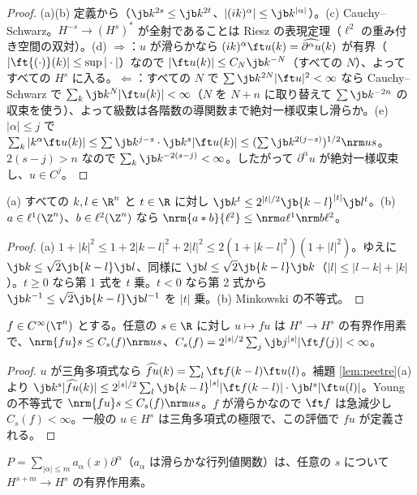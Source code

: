 \begin{proof}
(a)(b) 定義から（$\jb k^{2s}\le\jb k^{2t}$、$|(ik)^\alpha|\le\jb k^{|\alpha|}$）。(c) Cauchy--Schwarz。$H^{-s}\to(H^s)^*$ が全射であることは Riesz の表現定理（$\ell^2$ の重み付き空間の双対）。(d) $\Rightarrow$：$u$ が滑らかなら $(ik)^\alpha\ft u(k)=\widehat{\partial^\alpha u}(k)$ が有界（$|\ft{(\cdot)}(k)|\le\sup|\cdot|$）なので $|\ft u(k)|\le C_N\jb k^{-N}$（すべての $N$）、よってすべての $H^s$ に入る。$\Leftarrow$：すべての $N$ で $\sum\jb k^{2N}|\ft u|^2<\infty$ なら Cauchy--Schwarz で $\sum_k\jb k^{N}|\ft u(k)|<\infty$（$N$ を $N+n$ に取り替えて $\sum\jb k^{-2n}$ の収束を使う）、よって級数は各階数の導関数まで絶対一様収束し滑らか。(e) $|\alpha|\le j$ で $\sum_k|k^\alpha\ft u(k)|\le\sum\jb k^{j-s}\cdot\jb k^s|\ft u(k)|\le(\sum\jb k^{2(j-s)})^{1/2}\nrm us$。$2(s-j)>n$ なので $\sum_k\jb k^{-2(s-j)}<\infty$。したがって $\partial^\alpha u$ が絶対一様収束し、$u\in C^j$。
\end{proof}

\begin{lem}\label{lem:peetre}\tP
(a) すべての $k,l\in\R^n$ と $t\in\R$ に対し $\jb k^t\le2^{|t|/2}\jb{k-l}^{|t|}\jb l^t$。(b) $a\in\ell^1(\Z^n)$、$b\in\ell^2(\Z^n)$ なら $\nrm{a*b}{\ell^2}\le\nrm a{\ell^1}\nrm b{\ell^2}$。
\end{lem}
\begin{proof}
(a) $1+|k|^2\le1+2|k-l|^2+2|l|^2\le2(1+|k-l|^2)(1+|l|^2)$。ゆえに $\jb k\le\sqrt2\jb{k-l}\jb l$、同様に $\jb l\le\sqrt2\jb{k-l}\jb k$（$|l|\le|l-k|+|k|$）。$t\ge0$ なら第 1 式を $t$ 乗。$t<0$ なら第 2 式から $\jb k^{-1}\le\sqrt2\jb{k-l}\jb l^{-1}$ を $|t|$ 乗。(b) Minkowski の不等式。
\end{proof}
\begin{prop}[滑らかな関数の掛け算]\label{prop:mult}\tP
$f\in C^\infty(\T^n)$ とする。任意の $s\in\R$ に対し $u\mapsto fu$ は $H^s\to H^s$ の有界作用素で、$\nrm{fu}s\le C_{s}(f)\nrm us$、$C_s(f)=2^{|s|/2}\sum_j\jb j^{|s|}|\ft f(j)|<\infty$。
\end{prop}
\begin{proof}
$u$ が三角多項式なら $\widehat{fu}(k)=\sum_l\ft f(k-l)\ft u(l)$。補題 \ref{lem:peetre}(a) より $\jb k^s|\widehat{fu}(k)|\le2^{|s|/2}\sum_l\jb{k-l}^{|s|}|\ft f(k-l)|\cdot\jb l^s|\ft u(l)|$。Young の不等式で $\nrm{fu}s\le C_s(f)\nrm us$。$f$ が滑らかなので $\ft f$ は急減少し $C_s(f)<\infty$。一般の $u\in H^s$ は三角多項式の極限で、この評価で $fu$ が定義される。
\end{proof}
\begin{cor}\label{cor:Pbdd}
$P=\sum_{|\alpha|\le m}a_\alpha(x)\partial^\alpha$（$a_\alpha$ は滑らかな行列値関数）は、任意の $s$ について $H^{s+m}\to H^s$ の有界作用素。
\end{cor}

